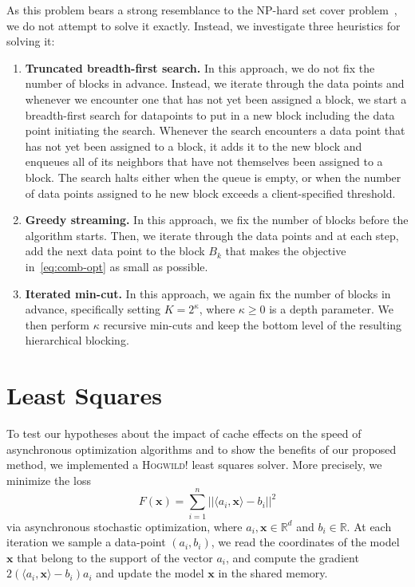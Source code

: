 \documentclass[times,11pt]{article}
\numberwithin{equation}{section}		%
\numberwithin{figure}{section}			%
\numberwithin{table}{section}				%
\newcommand{\ltwonorm}[1]{\left|\left|{#1}\right|\right|}
\newcommand{\xvec}{\mathbf{x}}
\newcommand{\HW}{\textsc{Hogwild!}}
\newcommand{\RR}{\mathbb{R}}
\begin{document}
As this problem bears a strong resemblance to the NP-hard set cover problem~\citep{}, we do not attempt to solve it exactly. Instead, we investigate three heuristics for solving it:
\begin{enumerate}
\item
{\bf Truncated breadth-first search.} In this approach, we do not fix the number of blocks in advance. Instead, we iterate through the data points and whenever we encounter one that has not yet been assigned a block, we start a breadth-first search for datapoints to put in a new block including the data point initiating the 
search. Whenever the search encounters a data point that has not yet been assigned to a block, it adds it to the new block and enqueues all of its neighbors that have not themselves been assigned to a block. The search halts either when the queue is empty, or when the number of data points assigned to he new block
exceeds a client-specified threshold.

\item
{\bf Greedy streaming.} In this approach, we fix the number of blocks before the algorithm starts. Then, we iterate through the data points and at each step, add the next data point to the block $B_{k}$ that makes the objective in~\eqref{eq:comb-opt} as small as possible.

\item
{\bf Iterated min-cut.} In this approach, we again fix the number of blocks in advance, specifically setting $K = 2^{\kappa}$, where $\kappa \geq 0$ is a depth parameter. We then perform $\kappa$ recursive min-cuts and keep the bottom level of the resulting hierarchical blocking.
\end{enumerate}

\section{Least Squares}\label{sec:ls}

To test our hypotheses about the impact of cache effects on the speed of asynchronous optimization algorithms and to show the benefits of our proposed method, we implemented a \HW{} least squares solver. More precisely, we minimize the loss 
\begin{equation}
\label{eq:LS}
F(\xvec) = \sum_{i = 1}^n \ltwonorm{\langle a_i, \xvec \rangle - b_i}^2
\end{equation}
via asynchronous stochastic optimization, where $a_i, \xvec \in \RR^d$ and $b_i\in \RR$. 
At each iteration we sample a data-point $(a_i, b_i)$, we read the coordinates of the model $\xvec$ that belong to the support of the vector $a_i$, and compute the gradient $2(\langle a_i, \xvec\rangle - b_i)a_i$ and update the model $\xvec$ in the shared memory.
\end{document}
